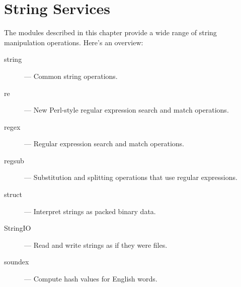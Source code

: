 \chapter{String Services}
\label{strings}

The modules described in this chapter provide a wide range of string
manipulation operations.  Here's an overview:

\begin{description}

\item[string]
--- Common string operations.

\item[re]
--- New Perl-style regular expression search and match operations.

\item[regex]
--- Regular expression search and match operations.

\item[regsub]
--- Substitution and splitting operations that use regular expressions.

\item[struct]
--- Interpret strings as packed binary data.

\item[StringIO]
--- Read and write strings as if they were files.

\item[soundex]
--- Compute hash values for English words.

\end{description}
